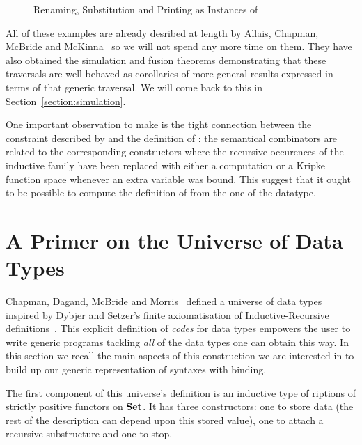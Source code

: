 \begin{figure}[h]
\begin{minipage}{0.40\textwidth}
\end{minipage}\hspace{1em}
\begin{minipage}{0.50\textwidth}
\end{minipage}
\caption{Renaming, Substitution and Printing as Instances of }
\end{figure}

All of these examples are already desribed at length by Allais, Chapman,
McBride and McKinna~\citeyear{allais2017type} so we will not spend any
more time on them. They have also obtained the simulation and fusion
theorems demonstrating that these traversals are well-behaved as
corollaries of more general results expressed in terms of that generic
traversal. We will come back to this in Section~\ref{section:simulation}.

One important observation to make is the tight connection between the
constraint described by  and the definition of : the
semantical combinators are related to the corresponding constructors
where the recursive occurences of the inductive family have been replaced
with either a computation or a Kripke function space whenever an
extra variable was bound. This suggest that it ought to be possible
to compute the definition of  from the one of the datatype.

\section{A Primer on the Universe of Data Types}

Chapman, Dagand, McBride and Morris~\citeyear{Chapman:2010:GAL:1863543.1863547}
defined a universe of data types inspired by Dybjer and Setzer's
finite axiomatisation of Inductive-Recursive definitions~\citeyear{Dybjer1999}.
This explicit definition of \emph{codes} for data types empowers the
user to write generic programs tackling \emph{all} of the data types
one can obtain this way. In this section we recall the main aspects
of this construction we are interested in to build up our generic
representation of syntaxes with binding.

The first component of this universe's definition is an inductive type
of riptions of strictly positive functors on $\mathbf{Set}{}$. It has
three constructors: one to store data (the rest of the description can
depend upon this stored value), one to attach a recursive substructure
and one to stop.

